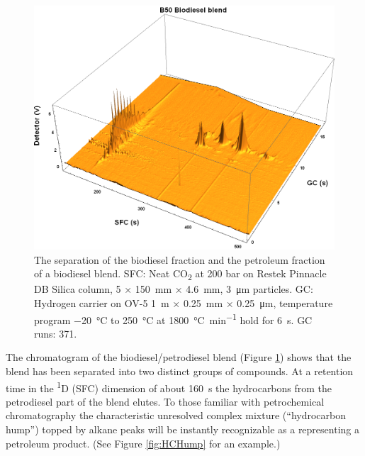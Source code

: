 \begin{figure}
	\centering
	\includegraphics[width=\textwidth]{Figures/B50.png}
	\decoRule	
	
\caption[Biodiesel separated from petrodiesel.]{The separation of the biodiesel
fraction and the petroleum fraction of a biodiesel blend. SFC: Neat
CO\textsubscript{2} at 200 bar on Restek Pinnacle DB Silica column, 5 × \SI{150}{\milli\metre} ×
\SI{4.6}{\milli\metre}, \SI{3}{\micro\metre} particles. GC: Hydrogen carrier on
OV-5 \SI{1}{\metre} × \SI{0.25}{\milli\metre} × \SI{0.25}{\micro\metre},
temperature program \SI{-20}{\celsius} to \SI{250}{\celsius} at
\SI{1800}{\celsius\per\minute} hold for \SI{6}{\second}. GC runs: 371.}

	
	\label{fig:B50} 
\end{figure}

The chromatogram of the biodiesel/petrodiesel blend (Figure \ref{fig:B50}) shows
that the blend has been separated into two distinct groups of compounds. At a
retention time in the \textsuperscript{1}D (SFC) dimension of about
\SI{160}{\second} the hydrocarbons from the petrodiesel part of the blend
elutes. To those familiar with petrochemical chromatography the characteristic
unresolved complex mixture (``hydrocarbon hump'') topped by alkane peaks will be
instantly recognizable as a representing a petroleum product. (See Figure
\ref{fig:HCHump} for an example.)


